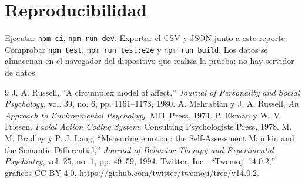 \documentclass[conference]{IEEEtran}
\begin{document}
\section*{Reproducibilidad}
Ejecutar \texttt{npm ci}, \texttt{npm run dev}. Exportar el CSV y JSON junto a este reporte. Comprobar \texttt{npm test}, \texttt{npm run test:e2e} y \texttt{npm run build}. Los datos se almacenan en el navegador del dispositivo que realiza la prueba; no hay servidor de datos.
\begin{thebibliography}{9}
 J. A. Russell, “A circumplex model of affect,” \emph{Journal of Personality and Social Psychology}, vol. 39, no. 6, pp. 1161--1178, 1980.
 A. Mehrabian y J. A. Russell, \emph{An Approach to Environmental Psychology}. MIT Press, 1974.
 P. Ekman y W. V. Friesen, \emph{Facial Action Coding System}. Consulting Psychologists Press, 1978.
 M. M. Bradley y P. J. Lang, “Measuring emotion: the Self-Assessment Manikin and the Semantic Differential,” \emph{Journal of Behavior Therapy and Experimental Psychiatry}, vol. 25, no. 1, pp. 49--59, 1994.
 Twitter, Inc., “Twemoji 14.0.2,” gráficos CC BY 4.0, \url{https://github.com/twitter/twemoji/tree/v14.0.2}.
\end{thebibliography}
\end{document}
